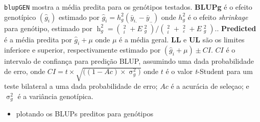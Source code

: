 \documentclass[
]{book}
\newenvironment{Shaded}{\begin{snugshade}}{\end{snugshade}}
\newcommand{\CommentTok}[1]{\textcolor[rgb]{0.56,0.35,0.01}{\textit{#1}}}
\newcommand{\KeywordTok}[1]{\textcolor[rgb]{0.13,0.29,0.53}{\textbf{#1}}}
\newcommand{\NormalTok}[1]{#1}
\newcommand{\OperatorTok}[1]{\textcolor[rgb]{0.81,0.36,0.00}{\textbf{#1}}}
\providecommand{\tightlist}{%
  \setlength{\itemsep}{0pt}\setlength{\parskip}{0pt}}
\begin{document}

\begin{Shaded}
\end{Shaded}

\texttt{blupGEN} mostra a média predita para os genótipos testados. \textbf{BLUPg} é o efeito genotípico \((\hat{g}_{i})\) estimado por \(\hat{g}_{i} = h_g^2(\bar{y}_{i.}-\bar{y}_{..})\) onde \(h_g^2\) é o efeito \emph{shrinkage} para genótipo, estimado por \(\mathop h\nolimits_g^2 = (\mathop {\hat \sigma }\nolimits_i^2 + E\mathop {\hat \sigma }\nolimits_g^2 )/(\mathop {\hat \sigma }\nolimits_i^2 + \mathop {\hat \sigma }\nolimits_\varepsilon ^2 + E\mathop {\hat \sigma }\nolimits_g^2 ).\). \textbf{Predicted} é a média predita por \(\hat{g}_{i}+\mu\) onde \(\mu\) é a média geral. \textbf{LL} e \textbf{UL} são os limites inferiore e superior, respectivamente estimado por \((\hat{g}_{i}+\mu)\pm{CI}\). \(CI\) é o intervalo de confiança para predição BLUP, assumindo uma dada probabilidade de erro, onde \(CI = t\times\sqrt{((1-Ac)\times{\mathop \sigma \nolimits_g^2)}}\) onde \(t\) é o valor \emph{t}-Student para um teste bilateral a uma dada probabilidade de erro; \(Ac\) é a acurácia de seleçao; e \(\mathop \sigma \nolimits_g^2\) é a variância genotípica.

\begin{itemize}
\tightlist
\item
  plotando os BLUPs preditos para genótipos
\end{itemize}
\end{document}
